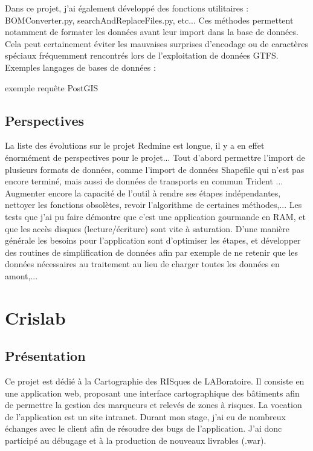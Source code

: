\begin{itemize}
Dans ce projet, j'ai également développé des fonctions utilitaires : BOMConverter.py, searchAndReplaceFiles.py, etc... Ces méthodes permettent notamment de formater les données avant leur import dans la base de données. Cela peut certainement éviter les mauvaises surprises d'encodage ou de caractères spéciaux fréquemment rencontrés lors de l'exploitation de données GTFS.\\




Exemples langages de bases de données :

exemple requête PostGIS




\subsection{Perspectives}

La liste des évolutions sur le projet Redmine est longue, il y a en effet énormément de perspectives pour le projet... Tout d'abord permettre l'import de plusieurs formats de données, comme l'import de données \og Shapefile \fg qui n'est pas encore terminé, mais aussi de données de transports en commun \og Trident \fg... Augmenter encore la capacité de l'outil à rendre ses étapes indépendantes, nettoyer les fonctions obsolètes, revoir l'algorithme de certaines méthodes,...
Les tests que j'ai pu faire démontre que c'est une application gourmande en RAM, et que les accès disques (lecture/écriture) sont vite à saturation. D'une manière générale les besoins pour l'application sont d'optimiser les étapes, et développer des routines de simplification de données afin par exemple de ne retenir que les données nécessaires au traitement au lieu de charger toutes les données en amont,... \\


\section{Crislab}\label{Divers}

\subsection{Présentation} 

Ce projet est dédié à la Cartographie des RISques de LABoratoire. Il consiste en une application web, proposant une interface cartographique des bâtiments afin de permettre la gestion des marqueurs et relevés de zones à risques. La vocation de l'application est un site intranet. Durant mon stage, j'ai eu de nombreux échanges avec le client afin de résoudre des bugs de l'application. J'ai donc participé au débugage et à la production de nouveaux livrables (.war).\\


\end{itemize}
